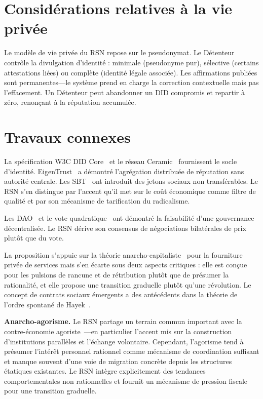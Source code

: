 \documentclass[11pt,a4paper,twocolumn]{article}
\begin{document}
\section{Considérations relatives à la vie privée}

Le modèle de vie privée du RSN repose sur le pseudonymat. Le Détenteur contrôle la divulgation d'identité : minimale (pseudonyme pur), sélective (certains attestations liées) ou complète (identité légale associée). Les affirmations publiées sont permanentes---le système prend en charge la correction contextuelle mais pas l'effacement. Un Détenteur peut abandonner un DID compromis et repartir à zéro, renonçant à la réputation accumulée.

\section{Travaux connexes}

La spécification W3C DID Core~\cite{did2022} et le réseau Ceramic~\cite{ceramic2023} fournissent le socle d'identité. EigenTrust~\cite{kamvar2003} a démontré l'agrégation distribuée de réputation sans autorité centrale. Les SBT~\cite{weyl2022} ont introduit des jetons sociaux non transférables. Le RSN s'en distingue par l'accent qu'il met sur le coût économique comme filtre de qualité et par son mécanisme de tarification du radicalisme.

Les DAO~\cite{buterin2014} et le vote quadratique~\cite{buterin2019} ont démontré la faisabilité d'une gouvernance décentralisée. Le RSN dérive son consensus de négociations bilatérales de prix plutôt que du vote.

La proposition s'appuie sur la théorie anarcho-capitaliste~\cite{rothbard1973,hoppe2001} pour la fourniture privée de services mais s'en écarte sous deux aspects critiques : elle est conçue pour les pulsions de rancune et de rétribution plutôt que de présumer la rationalité, et elle propose une transition graduelle plutôt qu'une révolution. Le concept de contrats sociaux émergents a des antécédents dans la théorie de l'ordre spontané de Hayek~\cite{hayek1973}.

\textbf{Anarcho-agorisme.} Le RSN partage un terrain commun important avec la contre-économie agoriste~\cite{konkin2006}---en particulier l'accent mis sur la construction d'institutions parallèles et l'échange volontaire. Cependant, l'agorisme tend à présumer l'intérêt personnel rationnel comme mécanisme de coordination suffisant et manque souvent d'une voie de migration concrète depuis les structures étatiques existantes. Le RSN intègre explicitement des tendances comportementales non rationnelles et fournit un mécanisme de pression fiscale pour une transition graduelle.
\end{document}
